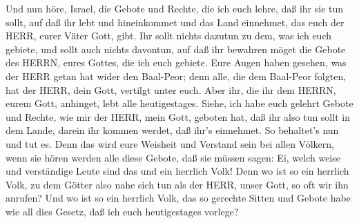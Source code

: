  Und nun höre, Israel, die Gebote und Rechte, die ich euch
lehre, daß ihr sie tun sollt, auf daß ihr lebt und hineinkommet und das
Land einnehmet, das euch der HERR, eurer Väter Gott, gibt. 
Ihr sollt nichts dazutun zu dem, was ich euch gebiete, und sollt auch
nichts davontun, auf daß ihr bewahren möget die Gebote des HERRN, eures
Gottes, die ich euch gebiete.  Eure Augen haben gesehen, was
der HERR getan hat wider den Baal-Peor; denn alle, die dem Baal-Peor
folgten, hat der HERR, dein Gott, vertilgt unter euch.  Aber
ihr, die ihr dem HERRN, eurem Gott, anhinget, lebt alle heutigestages.
 Siehe, ich habe euch gelehrt Gebote und Rechte, wie mir der
HERR, mein Gott, geboten hat, daß ihr also tun sollt in dem Lande,
darein ihr kommen werdet, daß ihr's einnehmet.  So
behaltet's nun und tut es. Denn das wird eure Weisheit und Verstand sein
bei allen Völkern, wenn sie hören werden alle diese Gebote, daß sie
müssen sagen: Ei, welch weise und verständige Leute sind das und ein
herrlich Volk!  Denn wo ist so ein herrlich Volk, zu dem
Götter also nahe sich tun als der HERR, unser Gott, so oft wir ihn
anrufen?  Und wo ist so ein herrlich Volk, das so gerechte
Sitten und Gebote habe wie all dies Gesetz, daß ich euch heutigestages
vorlege?

